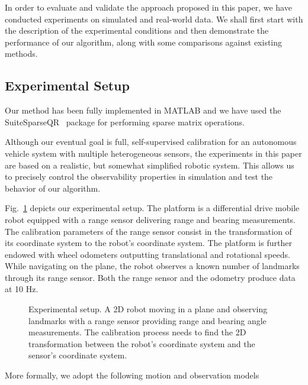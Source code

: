 In order to evaluate and validate the approach proposed in this paper, we have
conducted experiments on simulated and real-world data. We shall first start
with the description of the experimental conditions and then demonstrate the
performance of our algorithm, along with some comparisons against existing
methods.

\subsection{Experimental Setup}

Our method has been fully implemented in MATLAB and we have used the
SuiteSparseQR~\cite{davis11algorithm} package for performing sparse matrix
operations.

Although our eventual goal is full, self-supervised calibration for an
autonomous vehicle system with multiple heterogeneous sensors, the
experiments in this paper are based on a realistic, but somewhat
simplified robotic system. This allows us to precisely control the
observability properties in simulation and test the behavior of our
algorithm.

Fig.~\ref{fig:exp_setup} depicts our experimental setup. The platform
is a differential drive mobile robot equipped with a range sensor
delivering range and bearing measurements. The calibration parameters
of the range sensor consist in the transformation of its coordinate
system to the robot's coordinate system. The platform is further
endowed with wheel odometers outputting translational and rotational
speeds. While navigating on the plane, the robot observes a known
number of landmarks through its range sensor. Both the range sensor
and the odometry produce data at 10 Hz.

\begin{figure}[t]
\centering
\begin{tikzpicture}[scale = 1.0]
  
\end{tikzpicture}
\caption{Experimental setup. A 2D robot moving in a plane and observing
  landmarks with a range sensor providing range and bearing angle measurements.
  The calibration process needs to find the 2D transformation between the
  robot's coordinate system and the sensor's coordinate system.}
\label{fig:exp_setup}
\end{figure}

More formally, we adopt the following motion and observation models

